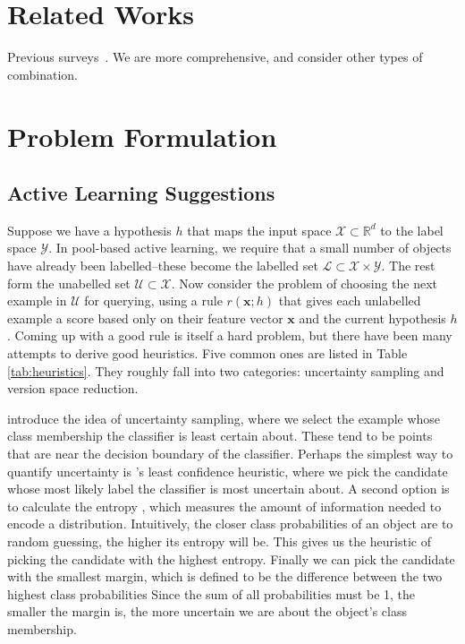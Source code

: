 \documentclass[fleqn,10pt,lineno]{wlpeerj} %
\newcommand{\X}{\mathcal{X}}
\newcommand{\Y}{\mathcal{Y}}
\newcommand{\Unlabelled}{\mathcal{U}}
\newcommand{\Labelled}{\mathcal{L}}
\begin{document}
\section*{Related Works}

Previous surveys~\cite{baram04, hsu15}.
We are more comprehensive, and consider other types of combination.

\section*{Problem Formulation}

\subsection*{Active Learning Suggestions}

Suppose we have a hypothesis $h$ that maps the input space $\X \subset
\mathbb{R}^d$ to the label space $\Y$. In pool-based active learning,
we require that a small number of
objects have already been labelled--these become the labelled set $\Labelled
\subset \X \times \Y$. The rest form the unabelled set $\Unlabelled \subset
\X$. Now consider the problem of choosing the next example in $\Unlabelled$ for
querying, using a rule $r(\bm{x}; h)$ that gives each unlabelled example a
score based only on their feature vector $\bm{x}$ and the current hypothesis
$h$. Coming up with a good rule is itself a hard problem, but there have been
many attempts to derive good heuristics. Five common ones are listed in Table
\ref{tab:heuristics}. They roughly fall into two categories: uncertainty
sampling and version space reduction.

\cite{lewis94} introduce the idea of uncertainty sampling, where we select the
example whose class membership the classifier is least certain about. These
tend to be points that are near the decision boundary of the classifier.
Perhaps the simplest way to quantify uncertainty is \cite{culotta05}'s least
confidence heuristic, where we pick the candidate whose most likely label the
classifier is most uncertain about. A second option is to calculate the entropy
\citep{shannon48}, which measures the amount of information needed to encode a
distribution. Intuitively, the closer class probabilities of an object are to
random guessing, the higher its entropy will be. This gives us the heuristic of
picking the candidate with the highest entropy. Finally we can pick the
candidate with the smallest margin, which is defined to be the difference
between the two highest class probabilities \citep{scheffer01} Since the sum of
all probabilities must be 1, the smaller the margin is, the more uncertain we
are about the object's class membership.
\end{document}
